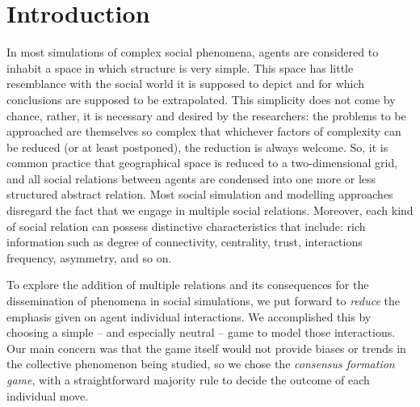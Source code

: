 \documentclass[preprint,number]{elsarticle}
\begin{document}
	\section{Introduction}
	\label{sec:introduction}
	
        \noindent In most simulations of complex social phenomena, agents are considered to inhabit
        a space in which structure is very simple. This space has little resemblance with the social
        world it is supposed to depict and for which conclusions are supposed to be
        extrapolated. This simplicity does not come by chance, rather, it is necessary and desired
        by the researchers: the problems to be approached are themselves so complex that whichever
        factors of complexity can be reduced (or at least postponed), the reduction is always
        welcome. So, it is common practice that geographical space is reduced to a two-dimensional
        grid, and all social relations between agents are condensed into one more or less structured
        abstract relation. Most social simulation and modelling approaches disregard the fact that
        we engage in multiple social relations. Moreover, each kind of social relation can possess
        distinctive characteristics that include: rich information such as degree of connectivity,
        centrality, trust, interactions frequency, asymmetry, and so on.
	
        To explore the addition of multiple relations and its consequences for the dissemination of
        phenomena in social simulations, we put forward to \textit{reduce} the emphasis given on
        agent individual interactions. We accomplished this by choosing a simple -- and especially
        neutral -- game to model those interactions. Our main concern was that the game itself would
        not provide biases or trends in the collective phenomenon being studied, so we chose the
        \textit{consensus formation game}, with a straightforward majority rule to decide the
        outcome of each individual move.
\end{document}
